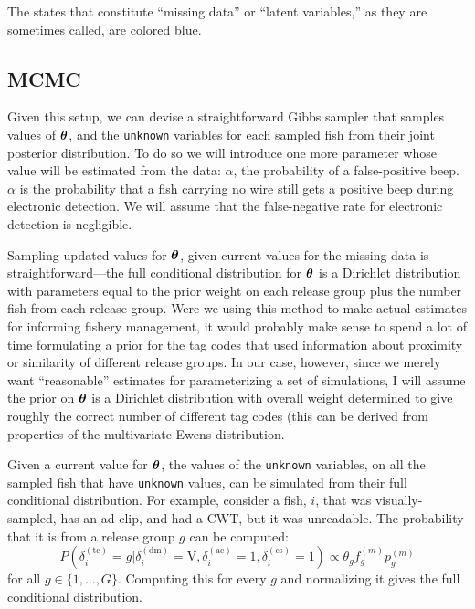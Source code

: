 \documentclass[11pt]{article}
\def\bm#1{\mathpalette\bmstyle{#1}}
\def\bmstyle#1#2{\mbox{\boldmath$#1#2$}}
\newcommand{\btheta}{\bm{\theta}}
\begin{document}
The states that constitute ``missing data'' or ``latent variables,'' as they are sometimes
called, are colored blue.

\subsection{MCMC}

Given this setup, we can devise a straightforward Gibbs sampler that samples values of $\btheta$, and the 
{\tt unknown} variables for each sampled fish from their joint posterior distribution. To do so we will
introduce one more parameter whose value will be estimated from the data:  $\alpha$, the probability
of a false-positive beep.  $\alpha$ is the probability that a fish carrying no wire still gets a positive
beep during electronic detection.  We will assume that the false-negative rate for electronic detection is
negligible.

Sampling updated values for $\btheta$, given current values for the missing data is straightforward---the 
full conditional distribution for $\btheta$ is a Dirichlet distribution
with parameters equal to the prior weight on each
release group plus the number fish from each release group.  Were we using this method to make actual estimates
for informing fishery management, it would probably make sense to spend a lot of time formulating a prior
for the tag codes that used information about proximity or similarity of different release groups. In our
case, however, since we merely want ``reasonable'' estimates for parameterizing a set of simulations, I will assume
the prior on $\btheta$ is a Dirichlet distribution with overall weight determined to give roughly the correct
number of different tag codes (this can be derived from properties of the multivariate Ewens distribution.

Given a current value for $\btheta$, the values of the {\tt unknown} variables, on all the sampled fish that have
{\tt unknown} values, can be simulated from their full conditional distribution.  For example,
consider a fish, $i$, that was visually-sampled, has an ad-clip, and had a CWT, but it was unreadable.  The 
probability that it is from a release group $g$ can be computed:
\[
P(\delta_i^{(\mathrm{tc})} = g | \delta_i^{(\mathrm{dm})}=\mathrm{V}, \delta_i^{(\mathrm{ac})} = 1, \delta_i^{(\mathrm{cs})} = 1)
\propto
\theta_g f_g^{(m)} p_g^{(m)}
\]
for all $g \in \{1,\ldots,G\}$. Computing this for every $g$ and normalizing it gives the full conditional distribution.
\end{document}
